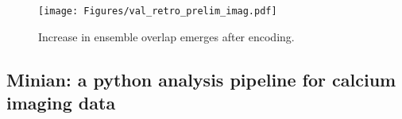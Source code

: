 \documentclass[master.tex]{subfiles}
\begin{document}
\begin{figure}
  \centering
  \texttt{[image: Figures/val\_retro\_prelim\_imag.pdf]}
  \caption{\footnotesize Increase in ensemble overlap emerges after encoding.}
  \label{fig:prelim_val_imag}
  \vspace{-25pt}
\end{figure}
\subsection*{Minian: a python analysis pipeline for calcium imaging data}
\end{document}
